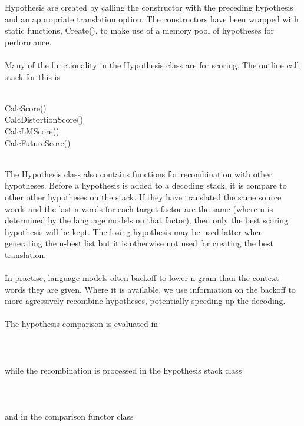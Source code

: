 \documentclass[11pt]{report}
\theoremstyle{plain}
\begin{document}
{Hypothesis are created by calling the constructor with the preceding hypothesis and an appropriate translation option. The constructors have been wrapped with static functions, Create(), to make use of a memory pool of hypotheses for performance.\\
\\
Many of the functionality in the Hypothesis class are for scoring. The outline call stack for this is\\
\\
\begin{tt}
\indent CalcScore()\\
\indent	\indent	CalcDistortionScore()\\
\indent	\indent	CalcLMScore()\\
\indent	\indent	CalcFutureScore()\\
\end{tt}
\\
The Hypothesis class also contains functions for recombination with other hypotheses. Before a hypothesis is added to a decoding stack, it is compare to other other hypotheses on the stack. If they have translated the same source words and the last n-words for each target factor are the same (where n is determined by the language models on that factor), then only the best scoring hypothesis will be kept. The losing hypothesis may be used latter when generating the n-best list but it is otherwise not used for creating the best translation.\\
\\
In practise, language models often backoff to lower n-gram than the context words they are given. Where it is available, we use information on the backoff to more agressively recombine hypotheses, potentially speeding up the decoding.\\
\\
The hypothesis comparison is evaluated in \\
\\
\\
\\
while the recombination is processed in the hypothesis stack class\\
\\
\\
\\
and in the comparison functor class\\
\\
}
\end{document}
